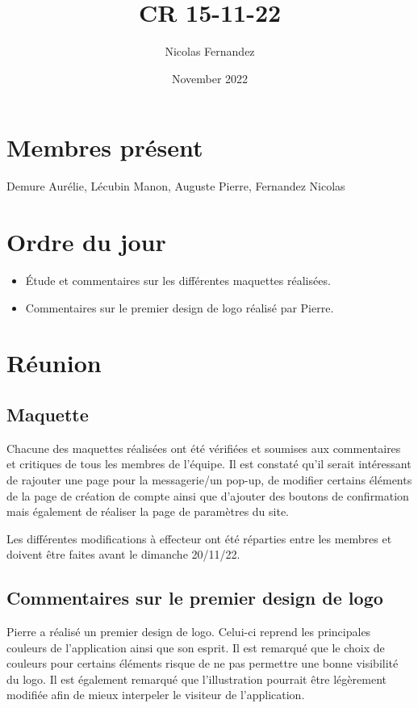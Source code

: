 \documentclass{report}
\title{CR 15-11-22}
\author{Nicolas Fernandez}
\date{November 2022}
\begin{document}
\maketitle

\section{Membres présent}
Demure Aurélie, Lécubin Manon, Auguste Pierre, Fernandez Nicolas

\section{Ordre du jour}

\begin{itemize}
    \item Étude et commentaires sur les différentes maquettes réalisées.
    \item Commentaires sur le premier design de logo réalisé par Pierre.
\end{itemize}

\section{Réunion}
\subsection{Maquette}

Chacune des maquettes réalisées ont été vérifiées et soumises aux commentaires et critiques de tous les membres de l'équipe. Il est constaté qu'il serait intéressant de rajouter une page pour la messagerie/un pop-up, de modifier certains éléments de la page de création de compte ainsi que d'ajouter des boutons de confirmation mais également de réaliser la page de paramètres du site.

Les différentes modifications à effecteur ont été réparties entre les membres et doivent être faites avant le dimanche 20/11/22.

\subsection{Commentaires sur le premier design de logo}

Pierre a réalisé un premier design de logo. Celui-ci reprend les principales couleurs de l'application ainsi que son esprit. Il est remarqué que le choix de couleurs pour certains éléments risque de ne pas permettre une bonne visibilité du logo. Il est également remarqué que l'illustration pourrait être légèrement modifiée afin de mieux interpeler le visiteur de l'application.
\end{document}
